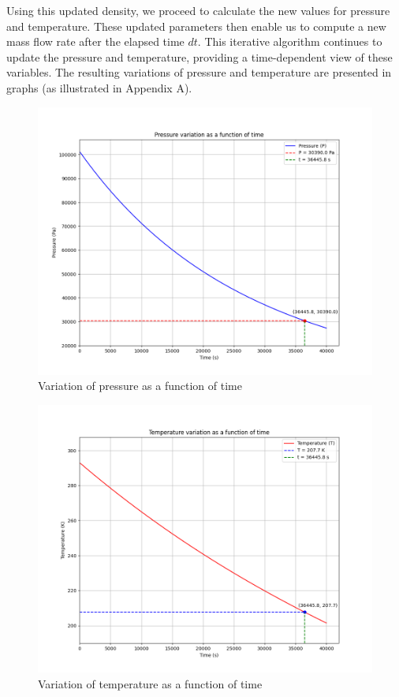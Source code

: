 \documentclass[a4paper, 14pt]{extarticle}
\begin{document}
Using this updated density, we proceed to calculate the new values for pressure and temperature. These updated parameters then enable us to compute a new mass flow rate after the elapsed time $dt$. This iterative algorithm continues to update the pressure and temperature, providing a time-dependent view of these variables. The resulting variations of pressure and temperature are presented in graphs (as illustrated in Appendix A). 
\begin{figure}[H]
\centering
\includegraphics[width=1\linewidth]{pressure_plot.png}
\caption{Variation of pressure as a function of time}
\end{figure}
\begin{figure}[H]
\centering
\includegraphics[width=1\linewidth]{temperature_plot.png}
\caption{Variation of temperature as a function of time}
\end{figure}
\end{document}
